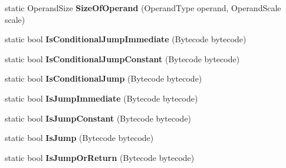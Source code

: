\begin{DoxyCompactItemize}
\item 
static Operand\+Size {\bfseries Size\+Of\+Operand} (Operand\+Type operand, Operand\+Scale scale)\hypertarget{classv8_1_1internal_1_1interpreter_1_1_bytecodes_a2def49847871cf41ebe40f45e894da74}{}\label{classv8_1_1internal_1_1interpreter_1_1_bytecodes_a2def49847871cf41ebe40f45e894da74}

\item 
static bool {\bfseries Is\+Conditional\+Jump\+Immediate} (Bytecode bytecode)\hypertarget{classv8_1_1internal_1_1interpreter_1_1_bytecodes_a4f1962a07a74bbae48c7642ffe5b122e}{}\label{classv8_1_1internal_1_1interpreter_1_1_bytecodes_a4f1962a07a74bbae48c7642ffe5b122e}

\item 
static bool {\bfseries Is\+Conditional\+Jump\+Constant} (Bytecode bytecode)\hypertarget{classv8_1_1internal_1_1interpreter_1_1_bytecodes_af37850c711088829a3074f45a87b46cb}{}\label{classv8_1_1internal_1_1interpreter_1_1_bytecodes_af37850c711088829a3074f45a87b46cb}

\item 
static bool {\bfseries Is\+Conditional\+Jump} (Bytecode bytecode)\hypertarget{classv8_1_1internal_1_1interpreter_1_1_bytecodes_ada199ac742086d0ae9222812708b4a85}{}\label{classv8_1_1internal_1_1interpreter_1_1_bytecodes_ada199ac742086d0ae9222812708b4a85}

\item 
static bool {\bfseries Is\+Jump\+Immediate} (Bytecode bytecode)\hypertarget{classv8_1_1internal_1_1interpreter_1_1_bytecodes_ac3d55e4503a5cd6f6a739c181f155a6c}{}\label{classv8_1_1internal_1_1interpreter_1_1_bytecodes_ac3d55e4503a5cd6f6a739c181f155a6c}

\item 
static bool {\bfseries Is\+Jump\+Constant} (Bytecode bytecode)\hypertarget{classv8_1_1internal_1_1interpreter_1_1_bytecodes_a7ae95f396257d815270150943d7f22f2}{}\label{classv8_1_1internal_1_1interpreter_1_1_bytecodes_a7ae95f396257d815270150943d7f22f2}

\item 
static bool {\bfseries Is\+Jump} (Bytecode bytecode)\hypertarget{classv8_1_1internal_1_1interpreter_1_1_bytecodes_a7e6f57e1f7bfc47f6ede4474a846db40}{}\label{classv8_1_1internal_1_1interpreter_1_1_bytecodes_a7e6f57e1f7bfc47f6ede4474a846db40}

\item 
static bool {\bfseries Is\+Jump\+Or\+Return} (Bytecode bytecode)\hypertarget{classv8_1_1internal_1_1interpreter_1_1_bytecodes_ac12db79f26e159c2c8f9405b30ab3c6f}{}\label{classv8_1_1internal_1_1interpreter_1_1_bytecodes_ac12db79f26e159c2c8f9405b30ab3c6f}


\end{DoxyCompactItemize}
